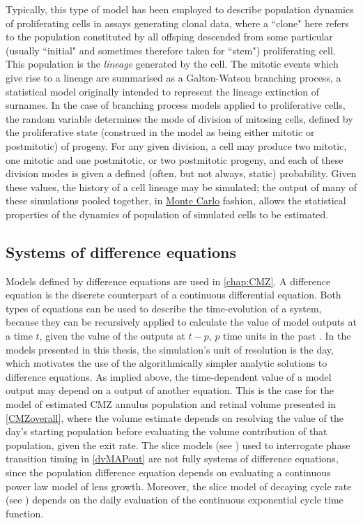 \documentclass{ut-thesis}
\begin{document}
\begin{NoHyper}
Typically, this type of model has been employed to describe population dynamics of proliferating cells in assays generating clonal data, where a ``clone" here refers to the population constituted by all offsping descended from some particular (usually ``initial" and sometimes therefore taken for ``stem") proliferating cell. This population is the \textit{lineage} generated by the cell. The mitotic events which give rise to a lineage are summarised as a Galton-Watson branching process, a statistical model originally intended to represent the lineage extinction of surnames. In the case of branching process models applied to proliferative cells, the random variable determines the mode of division of mitosing cells, defined by the proliferative state (construed in the model as being either mitotic or postmitotic) of progeny. For any given division, a cell may produce two mitotic, one mitotic and one postmitotic, or two postmitotic progeny, and each of these division modes is given a defined (often, but not always, static) probability. Given these values, the history of a cell lineage may be simulated; the output of many of these simulations pooled together, in \hyperref[ssec:MonteCarlo]{Monte Carlo} fashion, allows the statistical properties of the dynamics of population of simulated cells to be estimated.

\subsection{Systems of difference equations}
\label{ssec:SODE}
Models defined by difference equations are used in \autoref{chap:CMZ}. A difference equation is the discrete counterpart of a continuous differential equation. Both types of equations can be used to describe the time-evolution of a system, because they can be recursively applied to calculate the value of model outputs at a time $t$, given the value of the outputs at $t-p$, $p$ time units in the past \cite[p.1]{Kelley2001}. In the models presented in this thesis, the simulation's unit of resolution is the day, which motivates the use of the algorithmically simpler analytic solutions to difference equations. As implied above, the time-dependent value of a model output may depend on a output of another equation. This is the case for the model of estimated CMZ annulus population and retinal volume presented in \autoref{CMZoverall}, where the volume estimate depends on resolving the value of the day's starting population before evaluating the volume contribution of that population, given the exit rate. The slice models (see \hyperref[sec:slicemodel]{}) used to interrogate phase transition timing in \autoref{dvMAPout} are not fully systems of difference equations, since the population difference equation depends on evaluating a continuous power law model of lens growth. Moreover, the slice model of decaying cycle rate (see \hyperref[sec:decaymodel]{}) depends on the daily evaluation of the continuous exponential cycle time function.


\end{NoHyper}
\end{document}
